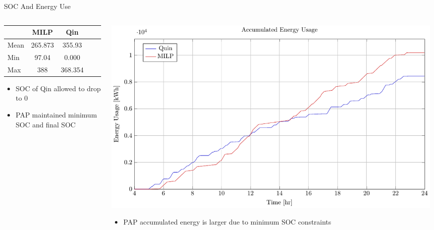 \documentclass[aspectratio=169]{beamer}
\begin{document}
\begin{frame}[label={sec:org3952e0a}]{SOC And Energy Use}
\begin{columns}
\begin{column}{0.5\columnwidth}
\begin{center}
\begin{tabular}{l|cccc}
\hline
 & MILP & Qin\\[0pt]
\hline
Mean & 265.873 & 355.93\\[0pt]
Min & 97.04 & 0.000\\[0pt]
Max & 388 & 368.354\\[0pt]
\hline
\end{tabular}
\end{center}

\begin{itemize}
\item SOC of Qin allowed to drop to 0
\item PAP maintained minimum SOC and final SOC
\end{itemize}
\end{column}

\begin{column}{0.5\columnwidth}
\begin{center}
\includegraphics[width=\textwidth]{./img/milp-pap/energy-milp-pap.pdf}
\end{center}

\begin{itemize}
\item PAP accumulated energy is larger due to minimum SOC constraints
\end{itemize}
\end{column}
\end{columns}
\end{frame}
\end{document}
